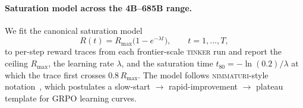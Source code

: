 
\paragraph{Saturation model across the 4B--685B range.}
\label{par:saturation}
We fit the canonical saturation model
\begin{equation}
  \label{eq:sat}
  R(t) = R_{\max}\bigl(1 - e^{-\lambda t}\bigr),
  \qquad t = 1, \dots, T,
\end{equation}
to per-step reward traces from each frontier-scale
\textsc{tinker} run and report the ceiling $R_{\max}$, the
learning rate $\lambda$, and the saturation time
$t_{80} = -\ln(0.2)/\lambda$ at which the trace first crosses
$0.8\,R_{\max}$.  The model follows
\textsc{nimmaturi}-style notation~\citep{nimmaturi2025predictive},
which postulates a slow-start $\to$ rapid-improvement $\to$
plateau template for GRPO learning curves.

